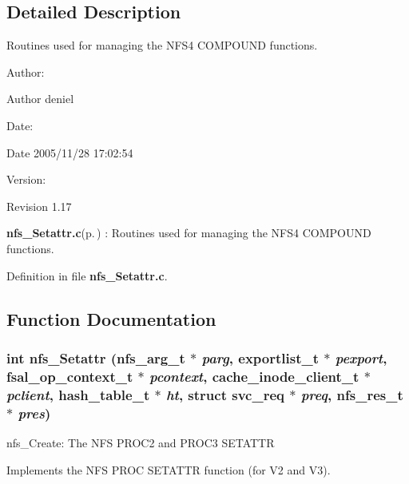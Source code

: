 \subsection{Detailed Description}
Routines used for managing the NFS4 COMPOUND functions. 

\begin{Desc}
\item[Author:]\begin{Desc}
\item[Author]deniel \end{Desc}
\end{Desc}
\begin{Desc}
\item[Date:]\begin{Desc}
\item[Date]2005/11/28 17:02:54 \end{Desc}
\end{Desc}
\begin{Desc}
\item[Version:]\begin{Desc}
\item[Revision]1.17 \end{Desc}
\end{Desc}
{\bf nfs\_\-Setattr.c}{\rm (p.\,\pageref{nfs__Setattr_8c})} : Routines used for managing the NFS4 COMPOUND functions.

Definition in file {\bf nfs\_\-Setattr.c}.

\subsection{Function Documentation}
\subsubsection{\setlength{\rightskip}{0pt plus 5cm}int nfs\_\-Setattr (nfs\_\-arg\_\-t $\ast$ {\em parg}, exportlist\_\-t $\ast$ {\em pexport}, fsal\_\-op\_\-context\_\-t $\ast$ {\em pcontext}, cache\_\-inode\_\-client\_\-t $\ast$ {\em pclient}, hash\_\-table\_\-t $\ast$ {\em ht}, struct svc\_\-req $\ast$ {\em preq}, nfs\_\-res\_\-t $\ast$ {\em pres})}\label{nfs__Setattr_8c_a0}


nfs\_\-Create: The NFS PROC2 and PROC3 SETATTR

Implements the NFS PROC SETATTR function (for V2 and V3).

